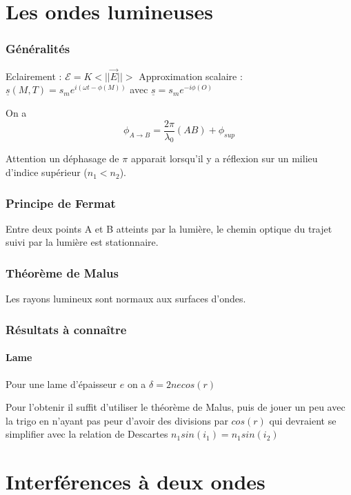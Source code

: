 \documentclass[9pt]{article}
\begin{document}
\begin{multicols*}{2}
\setlength{\columnseprule}{0.1pt}
\part{Les ondes lumineuses}                %

\section{Généralités}               %

Eclairement : $\mathcal{E} = K<||\vec{E}||>$
Approximation scalaire : $\underline{s}(M,T) = s_me^{i(\omega t - \phi(M))}$
avec $\underline{s}=s_me^{-i \phi(O)}$

On a
 $$\phi_{A \rightarrow B} = \frac{2 \pi}{\lambda_0} (AB) + \phi_{sup}$$

Attention un déphasage de $\pi$ apparait lorsqu'il y a réflexion sur un milieu d'indice supérieur ($n_1 < n_2$).

\section{Principe de Fermat}
Entre deux points A et B atteints par la lumière, le chemin optique du trajet suivi par la lumière est stationnaire.

\section{Théorème de Malus}
Les rayons lumineux sont normaux aux surfaces d'ondes.

\section{Résultats à connaître}

\subsection{Lame}
Pour une lame d'épaisseur $e$ on a $\boxed{\delta = 2 n e cos(r)}$

Pour l'obtenir il suffit d'utiliser le théorème de Malus, puis de jouer un peu avec la trigo en n'ayant pas peur d'avoir des divisions par $cos(r)$ qui devraient se simplifier avec la relation de Descartes $n_1sin(i_1)=n_1sin(i_2)$

\part{Interférences à deux ondes}                %

\end{multicols*}
\end{document}
